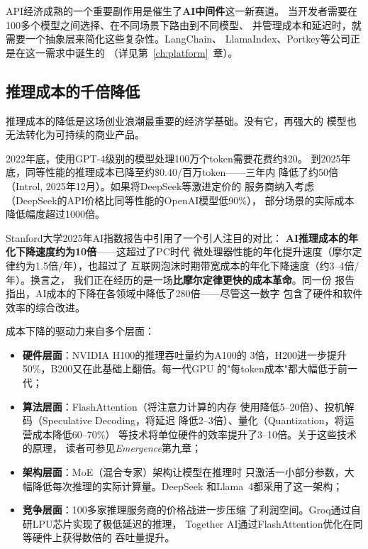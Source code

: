API经济成熟的一个重要副作用是催生了\textbf{AI中间件}这一新赛道。
当开发者需要在100多个模型之间选择、在不同场景下路由到不同模型、
并管理成本和延迟时，就需要一个抽象层来简化这些复杂性。LangChain、
LlamaIndex、Portkey等公司正是在这一需求中诞生的
（详见第~\ref{ch:platform}~章）。

\subsection{推理成本的千倍降低}

推理成本的降低是这场创业浪潮最重要的经济学基础。没有它，再强大的
模型也无法转化为可持续的商业产品。

2022年底，使用GPT-4级别的模型处理100万个token需要花费约\$20。
到2025年底，同等性能的推理成本已降至约\$0.40/百万token——三年内
降低了约50倍（Introl, 2025年12月）。如果将DeepSeek等激进定价的
服务商纳入考虑（DeepSeek的API价格比同等性能的OpenAI模型低90\%），
部分场景的实际成本降低幅度超过1000倍。

Stanford大学2025年AI指数报告中引用了一个引人注目的对比：
\textbf{AI推理成本的年化下降速度约为10倍}——这超过了PC时代
微处理器性能的年化提升速度（摩尔定律约为1.5倍/年），也超过了
互联网泡沫时期带宽成本的年化下降速度（约3--4倍/年）。换言之，
我们正在经历的是一场\textbf{比摩尔定律更快的成本革命}。同一份
报告指出，AI成本的下降在各领域中降低了280倍——尽管这一数字
包含了硬件和软件效率的综合改进。

成本下降的驱动力来自多个层面：

\begin{itemize}
  \item \textbf{硬件层面}：NVIDIA H100的推理吞吐量约为A100的
    3倍，H200进一步提升50\%，B200又在此基础上翻倍。每一代GPU
    的"每token成本"都大幅低于前一代；
  \item \textbf{算法层面}：FlashAttention（将注意力计算的内存
    使用降低5--20倍）、投机解码（Speculative Decoding，将延迟
    降低2--3倍）、量化（Quantization，将运营成本降低60--70\%）
    等技术将单位硬件的效率提升了3--10倍。关于这些技术的原理，
    读者可参见\textit{Emergence}第九章；
  \item \textbf{架构层面}：MoE（混合专家）架构让模型在推理时
    只激活一小部分参数，大幅降低每次推理的实际计算量。DeepSeek
    和Llama~4都采用了这一架构；
  \item \textbf{竞争层面}：100多家推理服务商的价格战进一步压缩
    了利润空间。Groq通过自研LPU芯片实现了极低延迟的推理，
    Together AI通过FlashAttention优化在同等硬件上获得数倍的
    吞吐量提升。
\end{itemize}

